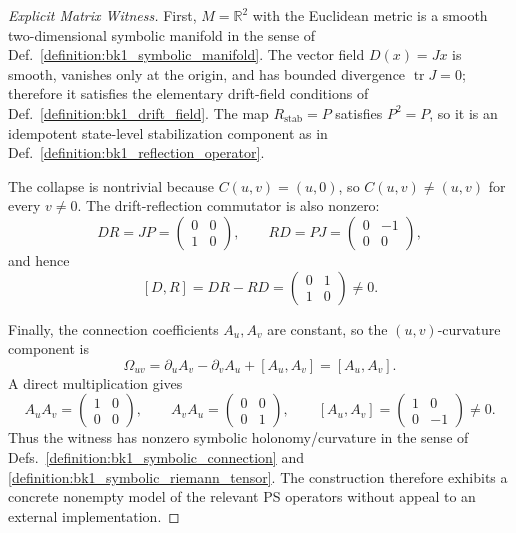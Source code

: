 \begin{proof}[Explicit Matrix Witness]
\label{proof:bk1_nonvacuity_minimal_linear_ps_model}
\leavevmode
First, \(M=\mathbb{R}^2\) with the Euclidean metric is a smooth
two-dimensional symbolic manifold in the sense of
Def.~\ref{definition:bk1_symbolic_manifold}.  The vector field \(D(x)=Jx\) is
smooth, vanishes only at the origin, and has bounded divergence
\(\operatorname{tr}J=0\); therefore it satisfies the elementary drift-field
conditions of Def.~\ref{definition:bk1_drift_field}.  The map
\(R_{\mathrm{stab}}=P\) satisfies \(P^2=P\), so it is an idempotent
state-level stabilization component as in Def.~\ref{definition:bk1_reflection_operator}.

The collapse is nontrivial because \(C(u,v)=(u,0)\), so \(C(u,v)\ne(u,v)\) for
every \(v\ne0\).  The drift-reflection commutator is also nonzero:
\[
DR = JP =
\begin{pmatrix}
0&0\\
1&0
\end{pmatrix},
\qquad
RD = PJ =
\begin{pmatrix}
0&-1\\
0&0
\end{pmatrix},
\]
and hence
\[
[D,R] = DR-RD =
\begin{pmatrix}
0&1\\
1&0
\end{pmatrix}
\ne 0.
\]

Finally, the connection coefficients \(A_u,A_v\) are constant, so the
\((u,v)\)-curvature component is
\[
\Omega_{uv}
=\partial_u A_v-\partial_v A_u+[A_u,A_v]
=[A_u,A_v].
\]
A direct multiplication gives
\[
A_uA_v =
\begin{pmatrix}
1&0\\
0&0
\end{pmatrix},
\qquad
A_vA_u =
\begin{pmatrix}
0&0\\
0&1
\end{pmatrix},
\qquad
[A_u,A_v] =
\begin{pmatrix}
1&0\\
0&-1
\end{pmatrix}
\ne0.
\]
Thus the witness has nonzero symbolic holonomy/curvature in the sense of
Defs.~\ref{definition:bk1_symbolic_connection} and
\ref{definition:bk1_symbolic_riemann_tensor}.  The construction therefore
exhibits a concrete nonempty model of the relevant PS operators without
appeal to an external implementation.
\end{proof}

